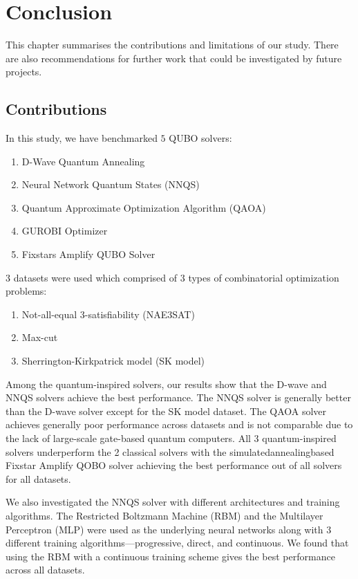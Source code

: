 \chapter{Conclusion}

This chapter summarises the contributions and limitations of our study. There are also recommendations for further work that could be investigated by future projects.

\section{Contributions}
In this study, we have benchmarked $5$ QUBO solvers:
\begin{enumerate}
    \item D-Wave Quantum Annealing
    \item Neural Network Quantum States (NNQS)
    \item Quantum Approximate Optimization Algorithm (QAOA)
    \item GUROBI Optimizer
    \item Fixstars Amplify QUBO Solver
\end{enumerate}
$3$ datasets were used which comprised of $3$ types of combinatorial optimization problems:
\begin{enumerate}
    \item Not-all-equal 3-satisfiability (NAE3SAT)
    \item Max-cut
    \item Sherrington-Kirkpatrick model (SK model)
\end{enumerate}
Among the quantum-inspired solvers, our results show that the D-wave and NNQS solvers achieve the best performance. The NNQS solver is generally better than the D-wave solver except for the SK model dataset. The QAOA solver achieves generally poor performance across datasets and is not comparable due to the lack of large-scale gate-based quantum computers. All 3 quantum-inspired solvers underperform the 2 classical solvers with the simulated\-annealing\-based Fixstar Amplify QOBO solver achieving the best performance out of all solvers for all datasets. 

We also investigated the NNQS solver with different architectures and training algorithms. The Restricted Boltzmann Machine (RBM) and the Multilayer Perceptron (MLP) were used as the underlying neural networks along with $3$ different training algorithms---progressive, direct, and continuous. We found that using the RBM with a continuous training scheme gives the best performance across all datasets.

